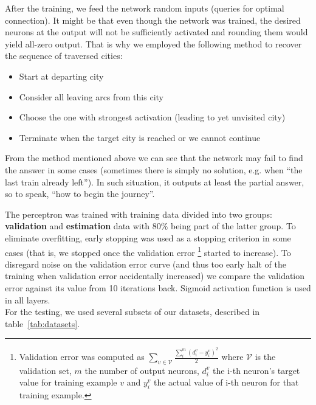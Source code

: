 \noindent After the training, we feed the network random inputs (queries for optimal connection). It might be that even though the network was trained, the desired neurons at the output will not be sufficiently activated and rounding them would yield all-zero output. That is why we employed the following method to recover the sequence of traversed cities:
\begin{itemize}
	\item Start at departing city
	\item Consider all leaving arcs from this city
	\item Choose the one with strongest activation (leading to yet unvisited city)
	\item Terminate when the target city is reached or we cannot continue
\end{itemize}
\hspace{\fill}

\noindent From the method mentioned above we can see that the network may fail to find the answer in some cases (sometimes there is simply no solution, e.g. when ``the last train already left''). In such situation, it outputs at least the partial answer, so to speak, ``how to begin the journey''.
	
The perceptron was trained with training data divided into two groups: \textbf{validation} and \textbf{estimation} data with $80\%$ being part of the latter group. To eliminate overfitting, early stopping was used as a stopping criterion in some cases (that is, we stopped once the validation error \footnote{Validation error was computed as $\sum_{v \in \mathcal{V}} \frac{\sum_{i}^{m} (d_{i}^{v} - y_{i}^{v})^{2}}{2}$ where $\mathcal{V}$ is the validation set, $m$ the number of output neurons, $d_{i}^{v}$ the i-th neuron's target value for training example $v$ and $y_{i}^{v}$ the actual value of i-th neuron for that training example.} started to increase). To disregard noise on the validation error curve (and thus too early halt of the training when validation error accidentally increased) we compare the validation error against its value from 10 iterations back. Sigmoid activation function is used in all layers.	\\
	
\noindent For the testing, we used several subsets of our datasets, described in table~\ref{tab:datasets}.
	
